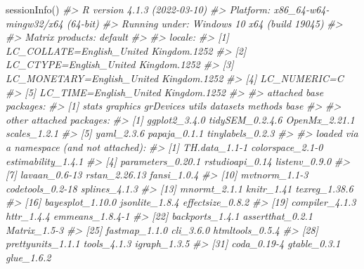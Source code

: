 \documentclass[
  man,floatsintext]{apa6}
\newenvironment{Shaded}{\begin{snugshade}}{\end{snugshade}}
\newcommand{\CommentTok}[1]{\textcolor[rgb]{0.56,0.35,0.01}{\textit{#1}}}
\newcommand{\FunctionTok}[1]{\textcolor[rgb]{0.00,0.00,0.00}{#1}}
\newcommand{\NormalTok}[1]{#1}
\begin{document}
\begin{Shaded}
\begin{Highlighting}[]
\FunctionTok{sessionInfo}\NormalTok{()}
\CommentTok{\#\textgreater{} R version 4.1.3 (2022{-}03{-}10)}
\CommentTok{\#\textgreater{} Platform: x86\_64{-}w64{-}mingw32/x64 (64{-}bit)}
\CommentTok{\#\textgreater{} Running under: Windows 10 x64 (build 19045)}
\CommentTok{\#\textgreater{} }
\CommentTok{\#\textgreater{} Matrix products: default}
\CommentTok{\#\textgreater{} }
\CommentTok{\#\textgreater{} locale:}
\CommentTok{\#\textgreater{} [1] LC\_COLLATE=English\_United Kingdom.1252 }
\CommentTok{\#\textgreater{} [2] LC\_CTYPE=English\_United Kingdom.1252   }
\CommentTok{\#\textgreater{} [3] LC\_MONETARY=English\_United Kingdom.1252}
\CommentTok{\#\textgreater{} [4] LC\_NUMERIC=C                           }
\CommentTok{\#\textgreater{} [5] LC\_TIME=English\_United Kingdom.1252    }
\CommentTok{\#\textgreater{} }
\CommentTok{\#\textgreater{} attached base packages:}
\CommentTok{\#\textgreater{} [1] stats     graphics  grDevices utils     datasets  methods   base     }
\CommentTok{\#\textgreater{} }
\CommentTok{\#\textgreater{} other attached packages:}
\CommentTok{\#\textgreater{} [1] ggplot2\_3.4.0    tidySEM\_0.2.4.6  OpenMx\_2.21.1    scales\_1.2.1    }
\CommentTok{\#\textgreater{} [5] yaml\_2.3.6       papaja\_0.1.1     tinylabels\_0.2.3}
\CommentTok{\#\textgreater{} }
\CommentTok{\#\textgreater{} loaded via a namespace (and not attached):}
\CommentTok{\#\textgreater{}   [1] TH.data\_1.1{-}1         colorspace\_2.1{-}0      estimability\_1.4.1   }
\CommentTok{\#\textgreater{}   [4] parameters\_0.20.1     rstudioapi\_0.14       listenv\_0.9.0        }
\CommentTok{\#\textgreater{}   [7] lavaan\_0.6{-}13         rstan\_2.26.13         fansi\_1.0.4          }
\CommentTok{\#\textgreater{}  [10] mvtnorm\_1.1{-}3         codetools\_0.2{-}18      splines\_4.1.3        }
\CommentTok{\#\textgreater{}  [13] mnormt\_2.1.1          knitr\_1.41            texreg\_1.38.6        }
\CommentTok{\#\textgreater{}  [16] bayesplot\_1.10.0      jsonlite\_1.8.4        effectsize\_0.8.2     }
\CommentTok{\#\textgreater{}  [19] compiler\_4.1.3        httr\_1.4.4            emmeans\_1.8.4{-}1      }
\CommentTok{\#\textgreater{}  [22] backports\_1.4.1       assertthat\_0.2.1      Matrix\_1.5{-}3         }
\CommentTok{\#\textgreater{}  [25] fastmap\_1.1.0         cli\_3.6.0             htmltools\_0.5.4      }
\CommentTok{\#\textgreater{}  [28] prettyunits\_1.1.1     tools\_4.1.3           igraph\_1.3.5         }
\CommentTok{\#\textgreater{}  [31] coda\_0.19{-}4           gtable\_0.3.1          glue\_1.6.2           }

\end{Highlighting}
\end{Shaded}
\end{document}
